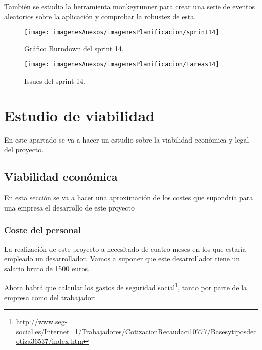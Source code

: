 También se estudio la herramienta monkeyrunner para crear una serie de eventos aleatorios sobre la aplicación y comprobar la robustez de esta.
\newpage
\begin{figure}[ht]
    \begin{center}%
        \begin{center}%
          \texttt{[image: imagenesAnexos/imagenesPlanificacion/sprint14]}%
          \caption{Gráfico Burndown del sprint 14.}%
          \label{figSprint14}%
        \end{center}%
  	\end{center}%
\end{figure}%
\newpage
\begin{figure}[h]
    \begin{center}%
        \begin{center}%
          \texttt{[image: imagenesAnexos/imagenesPlanificacion/tareas14]}%
          \caption{Issues del sprint 14.}%
          \label{figTareas14}%
        \end{center}%
  	\end{center}%
\end{figure}%

\newpage
\section{Estudio de viabilidad}

En este apartado se va a hacer un estudio sobre la viabilidad económica y legal del proyecto.

\subsection{Viabilidad económica}

En esta sección se va a hacer una aproximación de los costes que supondría para una empresa el desarrollo de este proyecto

\subsubsection{Coste del personal}

La realización de este proyecto a necesitado de cuatro meses en los que estaría empleado un desarrollador. Vamos a suponer que este desarrollador tiene un salario bruto de 1500 euros.

Ahora habrá que calcular los gastos de seguridad social\footnote{\url{http://www.seg-social.es/Internet_1/Trabajadores/CotizacionRecaudaci10777/Basesytiposdecotiza36537/index.htm}}, tanto por parte de la empresa como del trabajador:

